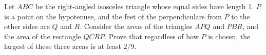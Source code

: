 Let $ABC$ be the right-angled isosceles triangle whose equal sides have length 1. $P$ is a point on the hypotenuse, and the feet of the perpendiculars from $P$ to the other sides are $Q$ and $R$. Consider the areas of the triangles $APQ$ and $PBR$,  and the area of the rectangle $QCRP$. Prove that regardless of how $P$ is chosen, the largest of these three areas is at least $2/9$.